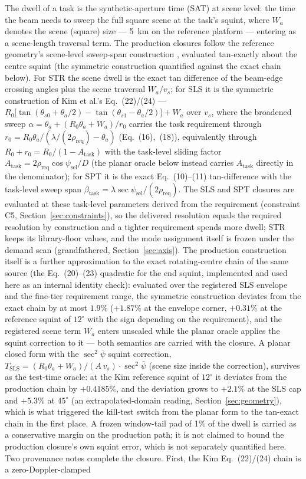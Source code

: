 \documentclass[preprint,authoryear]{elsarticle}
\begin{document}
The dwell of a task is the synthetic-aperture time (SAT) at scene level: the time the beam needs to sweep the full square scene at the task's squint, where $W_a$ denotes the scene (square) size --- 5~km on the reference platform --- entering as a scene-length traversal term. The production closures follow the reference geometry's scene-level sweep-span construction \citep{kim2021optimal}, evaluated tan-exactly about the centre squint (the symmetric construction quantified against the exact chain below). For STR the scene dwell is the exact tan difference of the beam-edge crossing angles plus the scene traversal $W_a/v_s$; for SLS it is the symmetric construction of Kim et al.'s Eq.~(22)/(24) --- $R_0\big[\tan(\theta_{s0}+\theta_a/2)-\tan(\theta_{s1}-\theta_a/2)\big]+W_a$ over $v_s$, where the broadened sweep $\alpha=\theta_a+(R_0\theta_a+W_a)/r_0$ carries the task requirement through $r_0=R_0\theta_a/(\lambda/(2\rho_{\mathrm{req}})-\theta_a)$ (Eq.~(16),~(18)), equivalently through $R_0+r_0=R_0/(1-A_{\mathrm{task}})$ with the task-level sliding factor $A_{\mathrm{task}}=2\rho_{\mathrm{req}}\cos\psi_{\mathrm{sel}}/D$ (the planar oracle below instead carries $A_{\mathrm{task}}$ directly in the denominator); for SPT it is the exact Eq.~(10)--(11) tan-difference with the task-level sweep span $\beta_{\mathrm{task}}=\lambda\sec\psi_{\mathrm{sel}}/(2\rho_{\mathrm{req}})$. The SLS and SPT closures are evaluated at these task-level parameters derived from the requirement (constraint C5, Section~\ref{sec:constraints}), so the delivered resolution equals the required resolution by construction and a tighter requirement spends more dwell; STR keeps its library-floor values, and the mode assignment itself is frozen under the demand scan (grandfathered, Section~\ref{sec:axis}). The production construction itself is a further approximation to the exact rotating-centre chain of the same source (the Eq.~(20)--(23) quadratic for the end squint, implemented and used here as an internal identity check): evaluated over the registered SLS envelope and the fine-tier requirement range, the symmetric construction deviates from the exact chain by at most $1.9\%$ ($+1.87\%$ at the envelope corner, $+0.31\%$ at the reference squint of $12^{\circ}$ with the sign depending on the requirement), and the registered scene term $W_a$ enters unscaled while the planar oracle applies the squint correction to it --- both semantics are carried with the closure. A planar closed form with the $\sec^2\bar\psi$ squint correction, $T_{\mathrm{SLS}}=(R_0\theta_a+W_a)/(A\,v_s)\cdot\sec^2\bar\psi$ (scene size inside the correction), survives as the test-time oracle: at the Kim reference squint of $12^{\circ}$ it deviates from the production chain by $+0.4185\%$, and the deviation grows to $+2.1\%$ at the SLS cap and $+5.3\%$ at $45^{\circ}$ (an extrapolated-domain reading, Section~\ref{sec:geometry}), which is what triggered the kill-test switch from the planar form to the tan-exact chain in the first place. A frozen window-tail pad of 1\% of the dwell is carried as a conservative margin on the production path; it is not claimed to bound the production closure's own squint error, which is not separately quantified here. Two provenance notes complete the closure. First, the Kim Eq.~(22)/(24) chain is a zero-Doppler-clamped 
\end{document}
